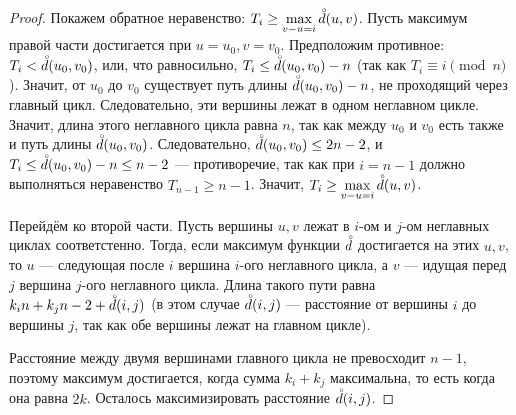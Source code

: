 \documentclass[12pt]{article}
\theoremstyle{definition}
\begin{document}
\begin{proof}
Покажем обратное неравенство: $T_i \ge \max\limits_{v - u = i} \accentset{\circ}{d}(u, v)$. Пусть максимум правой части достигается при $u = u_0, v = v_0$. Предположим противное: $T_i < \accentset{\circ}{d}(u_0, v_0)$, или, что равносильно, $T_i \le \accentset{\circ}{d}(u_0, v_0) - n$ (так как $T_i \equiv i \pmod{n}$). Значит, от $u_0$ до $v_0$ существует путь длины $\accentset{\circ}{d}(u_0, v_0) - n$, не проходящий через главный цикл. Следовательно, эти вершины лежат в одном неглавном цикле. Значит, длина этого неглавного цикла равна $n$, так как между $u_0$ и $v_0$ есть также и путь длины $\accentset{\circ}{d}(u_0, v_0)$. Следовательно, $\accentset{\circ}{d}(u_0, v_0) \le 2n - 2$, и $T_i \le \accentset{\circ}{d}(u_0, v_0) -n \le n - 2$ --- противоречие, так как при $i = n - 1$ должно выполняться неравенство $T_{n - 1} \ge n - 1$. Значит, $T_i \ge \max\limits_{v - u = i} \accentset{\circ}{d}(u, v)$.

Перейдём ко второй части. Пусть вершины $u, v$ лежат в $i$-ом и $j$-ом неглавных циклах соответстенно. Тогда, если максимум функции $\accentset{\circ}{d}$ достигается на этих $u, v$, то $u$ --- следующая после $i$ вершина $i$-ого неглавного цикла, а $v$ --- идущая перед $j$ вершина $j$-ого неглавного цикла. Длина такого пути равна $k_in + k_jn - 2 + \accentset{\circ}{d}(i, j)$ (в этом случае $\accentset{\circ}{d}(i, j)$ --- расстояние от вершины $i$ до вершины $j$, так как обе вершины лежат на главном цикле).

Расстояние между двумя вершинами главного цикла не превосходит $n - 1$, поэтому максимум достигается, когда сумма $k_i + k_j$ максимальна, то есть когда она равна $2k$. Осталось максимизировать расстояние $\accentset{\circ}{d}(i, j)$.
\end{proof}
\end{document}

